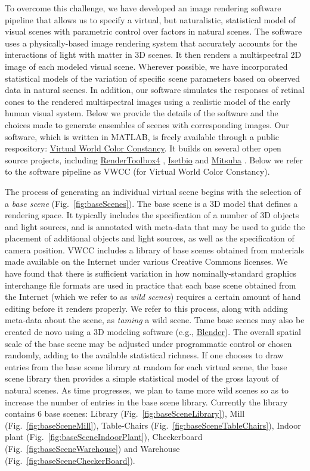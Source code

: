 \documentclass{jov}
\begin{document}
To overcome this  challenge, we have developed an image rendering software pipeline that allows us to specify a virtual, but naturalistic, statistical model of visual scenes with parametric control over factors in natural scenes. The software uses a physically-based image rendering system that accurately accounts for the interactions of light with matter in 3D scenes. It then renders a multispectral 2D image of each modeled visual scene. Wherever possible, we have incorporated statistical models of the variation of specific scene parameters based on observed data in natural scenes. In addition, our software simulates the responses of retinal cones to the rendered multispectral images using a realistic model of the early human visual system. Below we provide the details of the software and the choices made to generate ensembles of scenes with corresponding images. Our software, which is written in MATLAB, is freely available through a public respository: \href{https://github.com/BrainardLab/VirtualWorldColorConstancy}{Virtual World Color Constancy}. It builds on several other open source projects, including \href{http://rendertoolbox.org}{RenderToolbox4} \cite{heasly2014rendertoolbox3}, \href{http://isetbio.org}{Isetbio} and \href{https://www.mitsuba-renderer.org}{Mitsuba} \cite{jakob2015mitsuba}. Below we refer to the software pipeline as VWCC (for Virtual World Color Constancy).

The process of generating an individual virtual scene begins with the selection of a \textit{base scene} (Fig.~\ref{fig:baseScenes}). The base scene is a 3D model that defines a rendering space.  It typically includes the specification of a number of 3D objects and light sources, and is annotated with meta-data that may be used to guide the placement of additional objects and light sources, as well as the specification of camera position. VWCC includes a library of base scenes obtained from materials made available on the Internet under various Creative Commons licenses. We have found that there is sufficient variation in how nominally-standard graphics interchange file formats are used in practice that each base scene obtained from the Internet (which we refer to as \textit{wild scenes}) requires a certain amount of hand editing before it renders properly. We refer to this process, along with adding meta-data about the scene, as \textit{taming} a wild scene. Tame base scenes may also be created de novo using a 3D modeling software (e.g., \href{https://www.blender.org/}{Blender}).  The overall spatial scale of the base scene may be adjusted under programmatic control or chosen randomly, adding to the available statistical richness. If one chooses to draw entries from the base scene library at random for each virtual scene, the base scene library then provides a simple statistical model of the gross layout of natural scenes. As time progresses, we plan to tame more wild scenes so as to increase the number of entries in the base scene library. Currently the library contains 6 base scenes: Library (Fig.~\ref{fig:baseSceneLibrary}), Mill (Fig.~\ref{fig:baseSceneMill}), Table-Chairs (Fig.~\ref{fig:baseSceneTableChairs}), Indoor plant (Fig.~\ref{fig:baseSceneIndoorPlant}), Checkerboard (Fig.~\ref{fig:baseSceneWarehouse}) and Warehouse (Fig.~\ref{fig:baseSceneCheckerBoard}).
\end{document}
